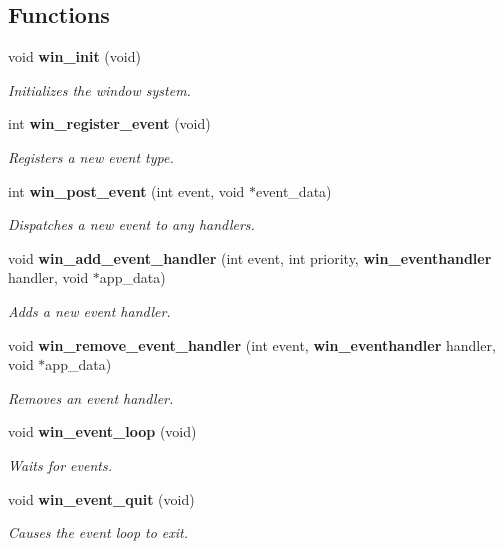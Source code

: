 \subsection*{Functions}
\begin{CompactItemize}
\item 
void {\bf win\_\-init} (void)
\begin{CompactList}\small\item\em Initializes the window system. \item\end{CompactList}\item 
int {\bf win\_\-register\_\-event} (void)
\begin{CompactList}\small\item\em Registers a new event type. \item\end{CompactList}\item 
int {\bf win\_\-post\_\-event} (int event, void $\ast$event\_\-data)
\begin{CompactList}\small\item\em Dispatches a new event to any handlers. \item\end{CompactList}\item 
void {\bf win\_\-add\_\-event\_\-handler} (int event, int priority, {\bf win\_\-eventhandler} handler, void $\ast$app\_\-data)
\begin{CompactList}\small\item\em Adds a new event handler. \item\end{CompactList}\item 
void {\bf win\_\-remove\_\-event\_\-handler} (int event, {\bf win\_\-eventhandler} handler, void $\ast$app\_\-data)
\begin{CompactList}\small\item\em Removes an event handler. \item\end{CompactList}\item 
void {\bf win\_\-event\_\-loop} (void)
\begin{CompactList}\small\item\em Waits for events. \item\end{CompactList}\item 
void {\bf win\_\-event\_\-quit} (void)\label{winevent_8h_a8}

\begin{CompactList}\small\item\em Causes the event loop to exit. \item\end{CompactList}\end{CompactItemize}


